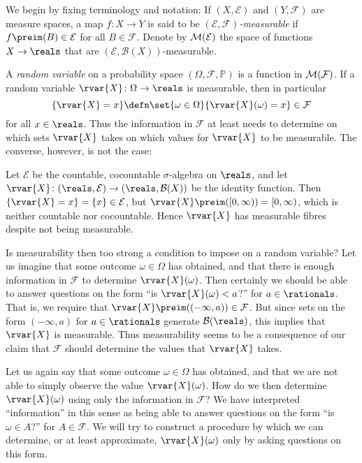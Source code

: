 \documentclass[article, a4paper, 11pt, oneside]{memoir}
\numberwithin{equation}{chapter}
\newcommand{\calB}{\mathcal{B}}
\newcommand{\calE}{\mathcal{E}}
\newcommand{\calF}{\mathcal{F}}
\newcommand{\borel}[1]{\calB(#1)}
\renewcommand{\P}{\mathbb{P}}
\begin{document}
We begin by fixing terminology and notation: If $(X,\calE)$ and $(Y,\calF)$ are measure spaces, a map $f \colon X \to Y$ is said to be \emph{$(\calE,\calF)$-measurable} if $f\preim(B) \in \calE$ for all $B \in \calF$. Denote by $\meas{\calE}$ the space of functions $X \to \reals$ that are $(\calE,\borel{X})$-measurable.

A \emph{random variable} on a probability space $(\Omega,\calF,\P)$ is a function in $\meas{\calF}$. If a random variable $\rvar{X} \colon \Omega \to \reals$ is measurable, then in particular
%
\begin{equation*}
    \{ \rvar{X} = x \}
        \defn \set{\omega \in \Omega}{\rvar{X}(\omega) = x}
        \in \calF
\end{equation*}
%
for all $x \in \reals$. Thus the information in $\calF$ at least needs to determine on which sets $\rvar{X}$ takes on which values for $\rvar{X}$ to be measurable. The converse, however, is not the case:
%
\begin{example}
    Let $\calE$ be the countable, cocountable $\sigma$-algebra on $\reals$, and let $\rvar{X} \colon (\reals, \calE) \to (\reals, \borel{X})$ be the identity function. Then $\{\rvar{X} = x\} = \{x\} \in \calE$, but $\rvar{X}\preim([0,\infty)) = [0,\infty)$, which is neither countable nor cocountable. Hence $\rvar{X}$ has measurable fibres despite not being measurable.
\end{example}
%
Is measurability then too strong a condition to impose on a random variable? Let us imagine that some outcome $\omega \in \Omega$ has obtained, and that there is enough information in $\calF$ to determine $\rvar{X}(\omega)$. Then certainly we should be able to answer questions on the form \enquote{is $\rvar{X}(\omega) < a$?} for $a \in \rationals$. That is, we require that $\rvar{X}\preim((-\infty,a)) \in \calF$. But since sets on the form $(-\infty,a)$ for $a \in \rationals$ generate $\borel{\reals}$, this implies that $\rvar{X}$ is measurable. Thus measurability seems to be a consequence of our claim that $\calF$ should determine the values that $\rvar{X}$ takes.

Let us again say that some outcome $\omega \in \Omega$ has obtained, and that we are not able to simply observe the value $\rvar{X}(\omega)$. How do we then determine $\rvar{X}(\omega)$ using only the information in $\calF$? We have interpreted \enquote{information} in this sense as being able to answer questions on the form \enquote{is $\omega \in A$?} for $A \in \calF$. We will try to construct a procedure by which we can determine, or at least approximate, $\rvar{X}(\omega)$ only by asking questions on this form.
\end{document}

